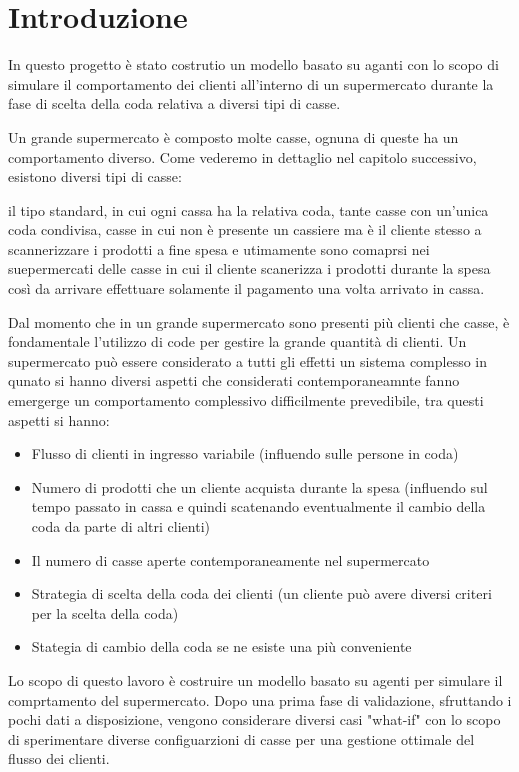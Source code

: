 \chapter{Introduzione}

In questo progetto è stato costrutio un modello basato su aganti con lo scopo di simulare il comportamento dei clienti all'interno di un supermercato durante la fase di scelta della coda relativa a diversi tipi di casse.

Un grande supermercato è composto molte casse, ognuna di queste ha un comportamento diverso.  Come vederemo in dettaglio nel capitolo successivo, esistono diversi tipi di casse:

il tipo standard, in cui ogni cassa ha la relativa coda, tante casse con un'unica coda condivisa, casse in cui non è presente un cassiere ma è il cliente stesso a scannerizzare i prodotti a fine spesa e utimamente sono comaprsi nei suepermercati delle casse in cui il cliente scanerizza i prodotti durante la spesa così da arrivare effettuare solamente il pagamento una volta arrivato in cassa.

Dal momento che in un grande supermercato sono presenti più clienti che casse, è fondamentale l'utilizzo di code per gestire la grande quantità di clienti.  Un supermercato può essere considerato a tutti gli effetti un sistema complesso in qunato si hanno diversi aspetti che considerati contemporaneamnte fanno emergerge un comportamento complessivo difficilmente prevedibile, tra questi aspetti si hanno:
\begin{itemize}
	\item Flusso di clienti in ingresso variabile (influendo sulle persone in coda)
	\item Numero di prodotti che un cliente acquista durante la spesa (influendo sul tempo passato in cassa e quindi scatenando eventualmente il cambio della coda da parte di altri clienti)
	\item Il numero di casse aperte contemporaneamente nel supermercato
	\item Strategia di scelta della coda dei clienti (un cliente può avere diversi criteri per la scelta della coda)
	\item Stategia di cambio della coda se ne esiste una più conveniente
\end{itemize}


Lo scopo di questo lavoro è costruire un modello basato su agenti per simulare il comprtamento del supermercato. Dopo una prima fase di validazione, sfruttando i pochi dati a disposizione, vengono considerare diversi casi "what-if" con lo scopo di sperimentare diverse configuarzioni di casse per una gestione ottimale del flusso dei clienti. 
